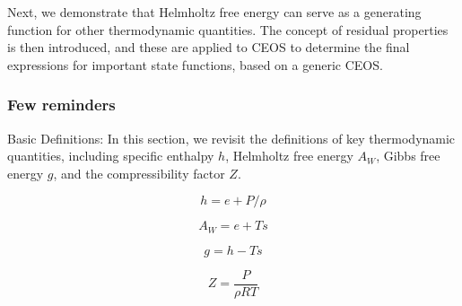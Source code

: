 	Next, we demonstrate that Helmholtz free energy can serve as a generating
	function for other thermodynamic quantities. The concept of residual properties
	is then introduced, and these are applied to CEOS to determine the final
	expressions for important state functions, based on a generic CEOS.

	\subsubsection{Few reminders}

	Basic Definitions: In this section, we revisit the definitions of key
	thermodynamic quantities, including specific enthalpy $h$, Helmholtz free
	energy $A_W$, Gibbs free energy $g$, and the compressibility factor $Z$.

	\begin{equation}
		h = e + P/\rho
	\end{equation}

	\begin{equation}
		A_W = e + Ts
	\end{equation}

	\begin{equation}
		g = h - Ts
	\end{equation}

	\begin{equation}
		Z = \frac{P}{\rho RT}
	\end{equation}
